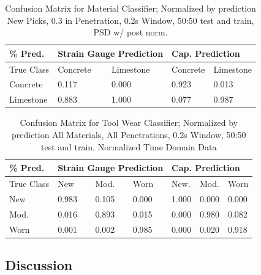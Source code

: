 \begin{table}[h]
\centering
\caption{Confusion Matrix for Material Classifier; Normalized by prediction \newline
         New Picks, 0.3 in Penetration, 0.2s Window, 50:50 test and train, PSD w/ post norm.}
\begin{tabular}{l|ll|ll}
\% Pred.   & \multicolumn{2}{l|}{Strain Gauge Prediction}                & \multicolumn{2}{l}{Cap. Prediction}                          \\ \hline
True Class & \multicolumn{1}{l|}{Concrete} & \multicolumn{1}{l|}{Limestone} & \multicolumn{1}{l|}{Concrete} & \multicolumn{1}{l|}{Limestone} \\ \hline
Concrete   & 0.117& 0.000                     &  0.923                    & 0.013\\
Limestone  & 0.883& 1.000                     &  0.077                    & 0.987
\end{tabular}
\label{tab:mat_conf}
\end{table}

\begin{table}[h]
\centering
\caption{Confusion Matrix for Tool Wear Classifier; Normalized by prediction \newline
         All Materials, All Penetrations, 0.2s Window, 50:50 test and train, Normalized Time Domain Data}
\begin{tabular}{l|lll|lll}
\% Pred.   & \multicolumn{3}{l|}{Strain Gauge Prediction}                & \multicolumn{3}{l}{Cap. Prediction}                          \\ \hline
True Class & \multicolumn{1}{l|}{New} & \multicolumn{1}{l|}{Mod.} & Worn & \multicolumn{1}{l|}{New.} & \multicolumn{1}{l|}{Mod.} & Worn \\ \hline
New         & 0.983   & 0.105  & 0.000      & 1.000     & 0.000     & 0.000 \\
Mod.        & 0.016   & 0.893  & 0.015      & 0.000     & 0.980     & 0.082 \\
Worn        & 0.001   & 0.002  & 0.985      & 0.000     & 0.020     & 0.918
\end{tabular}
\label{tab:wear_conf}
\end{table}

\subsection{Discussion}

